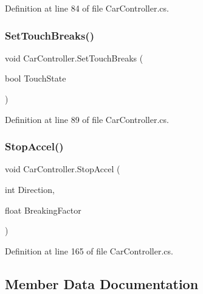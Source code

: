 Definition at line 84 of file Car\+Controller.\+cs.

\mbox{\label{class_car_controller_a367beef47c6525396ddff08c434be0be}} 
\subsubsection{\texorpdfstring{Set\+Touch\+Breaks()}{SetTouchBreaks()}}
{\footnotesize\ttfamily void Car\+Controller.\+Set\+Touch\+Breaks (\begin{DoxyParamCaption}\item[{bool}]{Touch\+State }\end{DoxyParamCaption})\hspace{0.3cm}{\ttfamily [inline]}}



Definition at line 89 of file Car\+Controller.\+cs.

\mbox{\label{class_car_controller_ab0533323230d12072b41602a84c96600}} 
\subsubsection{\texorpdfstring{Stop\+Accel()}{StopAccel()}}
{\footnotesize\ttfamily void Car\+Controller.\+Stop\+Accel (\begin{DoxyParamCaption}\item[{int}]{Direction,  }\item[{float}]{Breaking\+Factor }\end{DoxyParamCaption})\hspace{0.3cm}{\ttfamily [inline]}}



Definition at line 165 of file Car\+Controller.\+cs.



\subsection{Member Data Documentation}
\mbox{\label{class_car_controller_a7e13bb93d1eca2cb028b50197e26307a}} 
